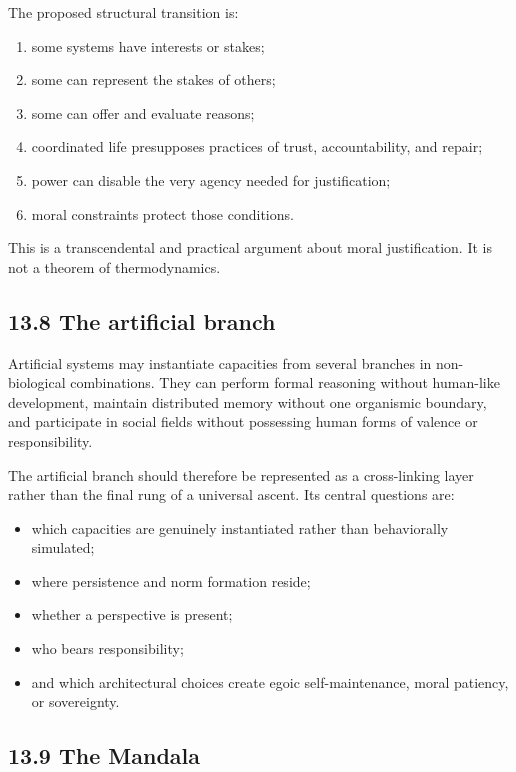\documentclass[
  11pt,
]{article}
\providecommand{\tightlist}{%
  \setlength{\itemsep}{0pt}\setlength{\parskip}{0pt}}
\begin{document}
The proposed structural transition is:

\begin{enumerate}
\def\labelenumi{\arabic{enumi}.}
\tightlist
\item
  some systems have interests or stakes;
\item
  some can represent the stakes of others;
\item
  some can offer and evaluate reasons;
\item
  coordinated life presupposes practices of trust, accountability, and
  repair;
\item
  power can disable the very agency needed for justification;
\item
  moral constraints protect those conditions.
\end{enumerate}

This is a transcendental and practical argument about moral
justification. It is not a theorem of thermodynamics.

\subsection{13.8 The artificial branch}\label{the-artificial-branch}

Artificial systems may instantiate capacities from several branches in
non-biological combinations. They can perform formal reasoning without
human-like development, maintain distributed memory without one
organismic boundary, and participate in social fields without possessing
human forms of valence or responsibility.

The artificial branch should therefore be represented as a cross-linking
layer rather than the final rung of a universal ascent. Its central
questions are:

\begin{itemize}
\tightlist
\item
  which capacities are genuinely instantiated rather than behaviorally
  simulated;
\item
  where persistence and norm formation reside;
\item
  whether a perspective is present;
\item
  who bears responsibility;
\item
  and which architectural choices create egoic self-maintenance, moral
  patiency, or sovereignty.
\end{itemize}

\subsection{13.9 The Mandala}\label{the-mandala}
\end{document}
